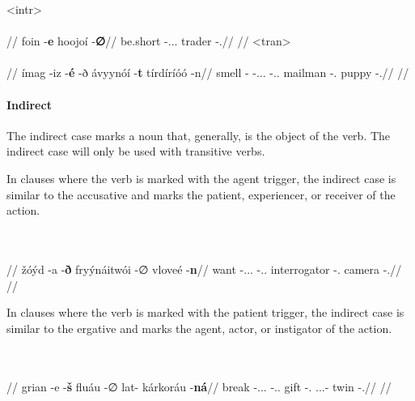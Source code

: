 	\a<intr>\begingl
		\glpreamble{}\\
		\\
		//
		\gla foin -\textbf{e} hoojoí -\textbf{∅}//
		\glb be.short -\Pt.\Dir.\Tps.\Prox{} trader -\Dir.\Sg//
		\glft {}//
		\endgl
	\a<tran>\begingl
		\glpreamble{}\\
		\\
		//
		\gla ímag -iz -\textbf{é} -ð ávyynóí -\textbf{t} tírdíríóó -n//
		\glb smell -\Gno{} -\Pt.\Dir.\Tps.\Prox{} -\Idr.\Tpp.\Obv{} mailman -\Dir.\Pl{} puppy -\Idr.\Sg//
		\glft {}//
	\endgl
\xe


\paragraph{Indirect}

The indirect case marks a noun that, generally, is the object of the verb. The indirect case will only be used with transitive verbs.

In clauses where the verb is marked with the agent trigger, the indirect case is similar to the accusative and marks the patient, experiencer, or receiver of the action.

	\begingl
		\glpreamble{}\\
		\\
		//
		\gla žóýd -a -\textbf{ð} fryýnáitwói -∅ vloveé -\textbf{n}//
		\glb want -\At.\Dir.\Tps.\Prox{} -\Idr.\Tps.\Obv{} interrogator -\Dir.\Sg{} camera -\Idr.\Sg//
		\glft {}//
	\endgl
\xe

In clauses where the verb is marked with the patient trigger, the indirect case is similar to the ergative and marks the agent, actor, or instigator of the action.

	\begingl
		\glpreamble{}\\
		\\
		//
		\gla grian -e -\textbf{š} fluáu -∅ lat- kárkoráu -\textbf{ná}//
		\glb break -\Pt.\Dir.\Tps.\Prox{} -\Idr.\Tpp.\Obv{} gift -\Dir.\Sg{} \Tps.\Indf.\Poss.\Inal- twin -\Idr.\Pl//
		\glft {}//
	\endgl
\xe

